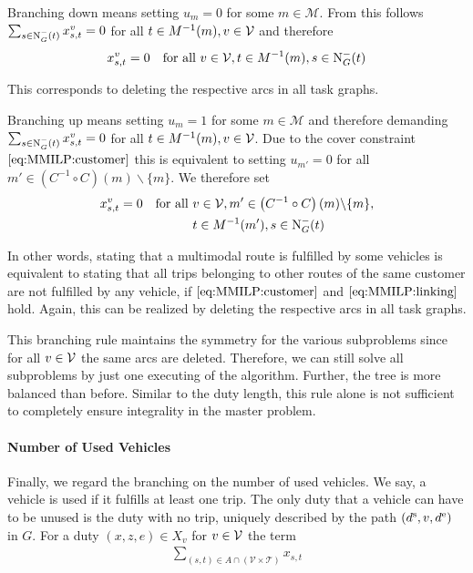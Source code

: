 Branching down means setting ${u_m = 0}$ for some ${m\in\mathcal{M}}$. From this follows ${\sum_{s\in\operatorname{N}_G^-(t)}x_{s,t}^v = 0}$ for all ${t\in M^{-1}(m)}, v\in\mathcal{V}$ and therefore
\begin{align*}
	x^v_{s,t} = 0 && \text{for all } v\in\mathcal{V}, t\in M^{-1}(m), s\in\operatorname{N}_G^-(t)
\end{align*}

This corresponds to deleting the respective arcs in all task graphs.

Branching up means setting ${u_m = 1}$ for some ${m\in\mathcal{M}}$ and therefore demanding ${\sum_{s\in\operatorname{N}_G^-(t)}x_{s,t}^v = 0}$ for all ${t\in M^{-1}(m)}, v\in\mathcal{V}$. Due to the cover constraint $\eqref{eq:MMILP:customer}$ this is equivalent to setting ${u_{m'} = 0}$ for all ${m'\in\left(C^{-1}\circ C\right)(m)\backslash\{m\}}$. We therefore set
\begin{align*}
	x^v_{s,t} = 0 && \text{for all } & v\in\mathcal{V}, m'\in\left(C^{-1}\circ C\right)(m)\backslash\{m\}, \\
	&&& t\in M^{-1}(m'), s\in\operatorname{N}_G^-(t)
\end{align*}

In other words, stating that a multimodal route is fulfilled by some vehicles is equivalent to stating that all trips belonging to other routes of the same customer are not fulfilled by any vehicle, if $\eqref{eq:MMILP:customer}$ and $\eqref{eq:MMILP:linking}$ hold. Again, this can be realized by deleting the respective arcs in all task graphs.

This branching rule maintains the symmetry for the various subproblems since for all $v\in\mathcal{V}$ the same arcs are deleted. Therefore, we can still solve all subproblems by just one executing of the algorithm. Further, the tree is more balanced than before. Similar to the duty length, this rule alone is not sufficient to completely ensure integrality in the master problem.

\paragraph{Number of Used Vehicles} \parfill

Finally, we regard the branching on the number of used vehicles. We say, a vehicle is used if it fulfills at least one trip. The only duty that a vehicle can have to be unused is the duty with no trip, uniquely described by the path ${\left(d^{\operatorname{s}},v,d^{\operatorname{e}}\right)}$ in $G$. For a duty $(x,z,e)\in X_v$ for $v\in\mathcal{V}$ the term
\begin{align*}
	\sum_{(s,t)\in A\cap\left(\mathcal{V}\times\mathcal{T}\right)} x_{s,t}
\end{align*}

